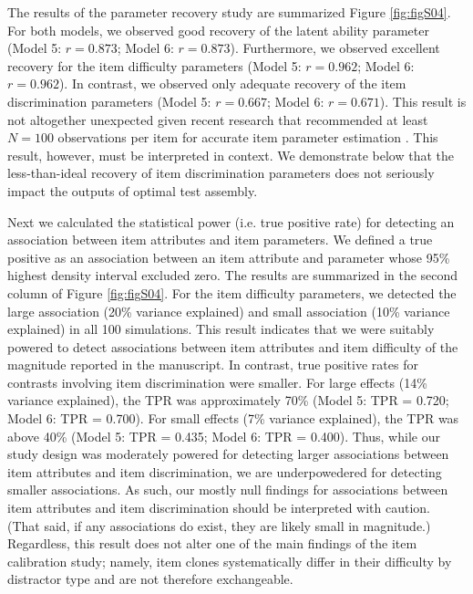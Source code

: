 \documentclass[a4paper,man,natbib]{apa6}
\begin{document}
The results of the parameter recovery study are summarized Figure \ref{fig:figS04}. For both models, we observed good recovery of the latent ability parameter (Model 5: $r = 0.873$; Model 6: $r = 0.873$). Furthermore, we observed excellent recovery for the item difficulty parameters (Model 5: $r = 0.962$; Model 6: $r = 0.962$). In contrast, we observed only adequate recovery of the item discrimination parameters (Model 5: $r = 0.667$; Model 6: $r = 0.671$). This result is not altogether unexpected given recent research that recommended at least $N=100$ observations per item for accurate item parameter estimation \cite{konig2020optimized}. This result, however, must be interpreted in context. We demonstrate below that the less-than-ideal recovery of item discrimination parameters does not seriously impact the outputs of optimal test assembly. 

Next we calculated the statistical power (i.e. true positive rate) for detecting an association between item attributes and item parameters. We defined a true positive as an association between an item attribute and parameter whose 95\% highest density interval excluded zero. The results are summarized in the second column of Figure \ref{fig:figS04}. For the item difficulty parameters, we detected the large association (20\% variance explained) and small association (10\% variance explained) in all 100 simulations. This result indicates that we were suitably powered to detect associations between item attributes and item difficulty of the magnitude reported in the manuscript. In contrast, true positive rates for contrasts involving item discrimination were smaller. For large effects (14\% variance explained), the TPR was approximately 70\% (Model 5: TPR = 0.720; Model 6: TPR = 0.700). For small effects (7\% variance explained), the TPR was above 40\% (Model 5: TPR = 0.435; Model 6: TPR = 0.400). Thus, while our study design was moderately powered for detecting larger associations between item attributes and item discrimination, we are underpowedered for detecting smaller associations. As such, our mostly null findings for associations between item attributes and item discrimination should be interpreted with caution. (That said, if any associations do exist, they are likely small in magnitude.) Regardless, this result does not alter one of the main findings of the item calibration study; namely, item clones systematically differ in their difficulty by distractor type and are not therefore exchangeable. 
\end{document}
